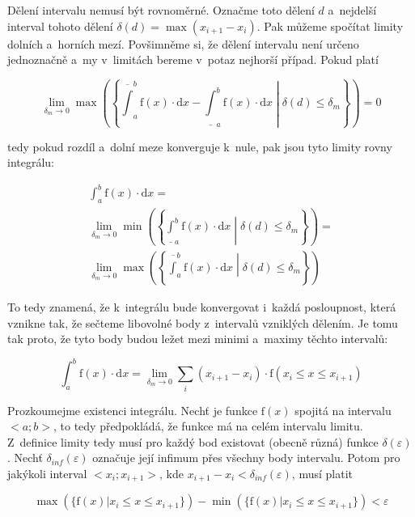 Dělení intervalu nemusí být rovnoměrné. Označme toto dělení \(d\) a~nejdelší interval tohoto dělení \(\delta(d) = \max(x_{i+1} - x_i)\). Pak můžeme spočítat limity dolních a~horních mezí. Povšimněme si, že dělení intervalu není určeno jednoznačně a~my v~limitách bereme v~potaz nejhorší případ. Pokud platí

\begin{equation}
\lim_{\delta_m \to 0} \max \left(\left\{\overline{\int}_a^b \mathrm{f}(x) \cdot \mathrm{d}x - \underline{\int}_a^b \mathrm{f}(x) \cdot \mathrm{d}x \middle| \delta(d) \leq \delta_m \right\}\right) = 0
\end{equation}

tedy pokud rozdíl a~dolní meze konverguje k~nule, pak jsou tyto limity rovny integrálu:

\begin{equation}
\begin{split}
\int_a^b \mathrm{f}(x) \cdot \mathrm{d}x = \\
\lim_{\delta_m \to 0} \min \left(\left\{\underline{\int}_a^b \mathrm{f}(x) \cdot \mathrm{d}x \middle| \delta(d) \leq \delta_m \right\}\right) = \\
\lim_{\delta_m \to 0} \max \left(\left\{\overline{\int}_a^b \mathrm{f}(x) \cdot \mathrm{d}x \middle| \delta(d) \leq \delta_m \right\}\right)
\end{split}
\end{equation}

To tedy znamená, že k~integrálu bude konvergovat i~každá posloupnost, která vznikne tak, že sečteme libovolné body z~intervalů vzniklých dělením. Je tomu tak proto, že tyto body budou ležet mezi minimi a~maximy těchto intervalů:

\begin{equation}
\label{eq:vypocet_integralu}
\int_a^b \mathrm{f}(x) \cdot \mathrm{d}x = \lim_{\delta_m \to 0} \sum_{i} (x_{i+1} - x_i) \cdot \mathrm{f}(x_i \leq x \leq x_{i+1})
\end{equation}

Prozkoumejme existenci integrálu. Nechť je funkce \(\mathrm{f}(x)\) spojitá na intervalu \(<a; b>\), to tedy předpokládá, že funkce má na celém intervalu limitu. Z~definice limity tedy musí pro každý bod existovat (obecně různá) funkce \(\delta(\varepsilon)\). Nechť \(\delta_{inf}(\varepsilon)\) označuje její infimum přes všechny body intervalu. Potom pro jakýkoli interval \(<x_i; x_{i+1}>\), kde \(x_{i+1} - x_i < \delta_{inf}(\varepsilon)\), musí platit 

\begin{equation}
\max(\{\mathrm{f}(x) | x_i \leq x \leq x_{i+1}\}) - \min(\{\mathrm{f}(x) | x_i \leq x \leq x_{i+1}\}) < \varepsilon
\end{equation}

